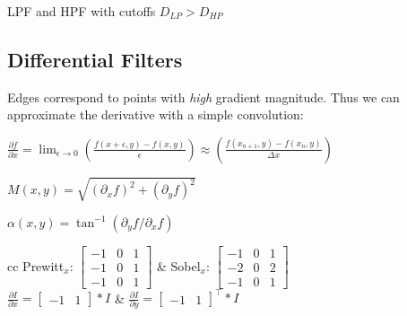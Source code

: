 \begin{definition}
  LPF and HPF with cutoffs \(D_{LP} > D_{HP}\)
\end{definition}

\subsection{Differential Filters}
Edges correspond to points with \textit{high} gradient magnitude. Thus we can approximate the derivative with a simple convolution:
\begin{center}
  \(\frac{\partial f}{\partial x} = \lim_{\epsilon \to 0}\left(\frac{f(x + \epsilon, y) - f(x, y)}{\epsilon}\right) \approx \left(\frac{f(x_{n+1}, y) - f(x_n, y)}{\varDelta x}\right)\)
\end{center}

\begin{definition}
  \(M(x, y) = \sqrt{\left(\partial_x f\right)^2 + \left(\partial_y f\right)^2}\)
\end{definition}

\begin{definition}
  \(\alpha(x, y) = \tan^{-1}\left(\partial_y f / \partial_x f\right)\)
\end{definition}

\begin{tabularx}{\linewidth}{cc}
  Prewitt\(_x\): \(\begin{bmatrix}
    -1 & 0 & 1 \\
    -1 & 0 & 1 \\
    -1 & 0 & 1
  \end{bmatrix}\) & 
  Sobel\(_x\): \(\begin{bmatrix}
    -1 & 0 & 1 \\
    -2 & 0 & 2 \\
    -1 & 0 & 1
  \end{bmatrix}\) \\
  \(\frac{\partial I}{\partial x} = \begin{bmatrix}
    -1 & 1
  \end{bmatrix} \ast I\) &
  \(\frac{\partial I}{\partial y} = \begin{bmatrix}
    -1 & 1
  \end{bmatrix}^\top \ast I\)
\end{tabularx}

